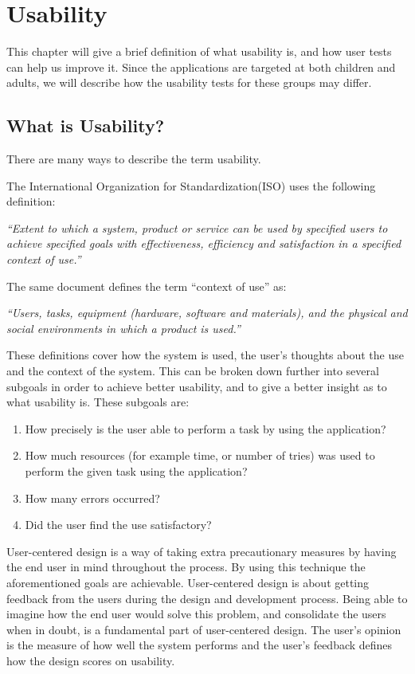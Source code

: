 \chapter{Usability}
\label{chp:usability}

This chapter will give a brief definition of what usability is, and how user tests can help us improve it. Since the applications are targeted at both children and adults, we will describe how the usability tests for these groups may differ.

\section{What is Usability?}
\label{sec:usability}
There are many ways to describe the term usability. 

The International Organization for Standardization(ISO) uses the following definition\cite{isousability}:

\textit{``Extent to which a system, product or service can be used by specified
users to achieve specified goals with effectiveness, efficiency
and satisfaction in a specified context of use.''}

The same document defines the term ``context of use'' as:

\textit{``Users, tasks, equipment (hardware, software and materials), and
the physical and social environments in which a product is used.''}

These definitions cover how the system is used, the user's thoughts about the use and the context of the system. This can be broken down further into several subgoals in order to achieve better usability, and to give a better insight as to what usability is. 
These subgoals are:

\begin{enumerate}
\item{How precisely is the user able to perform a task by using the application?}
\item{How much resources (for example time, or number of tries) was used to perform the given task using the application?}
\item{How many errors occurred?}
\item{Did the user find the use satisfactory?}
\end{enumerate}

User-centered design is a way of taking extra precautionary measures by having the end user in mind throughout the process. By using this technique the aforementioned goals are achievable. User-centered design is about getting feedback from the users during the design and development process. Being able to imagine how the end user would solve this problem, and consolidate the users when in doubt, is a fundamental part of user-centered design. The user's opinion is the measure of how well the system performs and the user's feedback defines how the design scores on usability.


